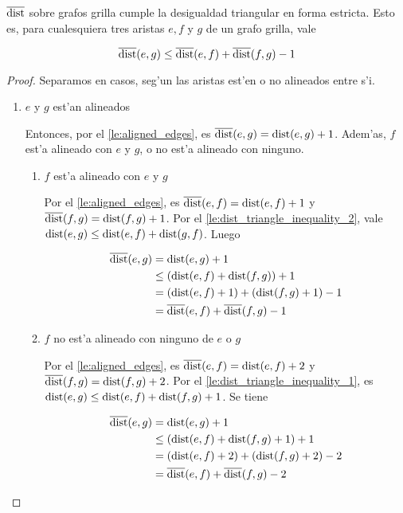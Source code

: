 \begin{theorem}
\label{th:distmax_clients_is_metric_strictly}
$\overline{\textnormal{dist}}$ sobre grafos grilla cumple la desigualdad triangular en forma estricta. Esto es, para cualesquiera tres aristas $e, f$ y $g$ de un grafo grilla, vale

\[\overline{\textnormal{dist}}(e, g) \leq \overline{\textnormal{dist}}(e, f) + \overline{\textnormal{dist}}(f, g) - 1\]

\begin{proof}
Separamos en casos, seg'un las aristas est'en o no alineados entre s'i.

\begin{enumerate}
\item $e$ y $g$ est'an alineados

Entonces, por el \autoref{le:aligned_edges}, es $\overline{\textnormal{dist}}(e, g) = \textnormal{dist}(e, g) + 1$. Adem'as, $f$ est'a alineado con $e$ y $g$, o no est'a alineado con ninguno.

\begin{enumerate}
\item $f$ est'a alineado con $e$ y $g$

Por el \autoref{le:aligned_edges}, es $\overline{\textnormal{dist}}(e, f) = \textnormal{dist}(e, f) + 1$ y $\overline{\textnormal{dist}}(f, g) = \textnormal{dist}(f, g) + 1$. Por el \autoref{le:dist_triangle_inequality_2}, vale $\textnormal{dist}(e, g) \leq \textnormal{dist}(e, f) + \textnormal{dist}(g, f)$. Luego

\begin{align*}
\overline{\textnormal{dist}}(e, g) &= \textnormal{dist}(e, g) + 1\\
&\leq (\textnormal{dist}(e, f) + \textnormal{dist}(f, g)) + 1\\
&= (\textnormal{dist}(e, f) + 1) + (\textnormal{dist}(f, g) + 1) - 1\\
&= \overline{\textnormal{dist}}(e, f) + \overline{\textnormal{dist}}(f, g) - 1
\end{align*}

\item $f$ no est'a alineado con ninguno de $e$ o $g$

Por el \autoref{le:aligned_edges}, es $\overline{\textnormal{dist}}(e, f) = \textnormal{dist}(e, f) + 2$ y $\overline{\textnormal{dist}}(f, g) = \textnormal{dist}(f, g) + 2$. Por el \autoref{le:dist_triangle_inequality_1}, es $\textnormal{dist}(e, g) \leq \textnormal{dist}(e, f) + \textnormal{dist}(f, g) + 1$. Se tiene

\begin{align*}
\overline{\textnormal{dist}}(e, g) &= \textnormal{dist}(e, g) + 1\\
&\leq (\textnormal{dist}(e, f) + \textnormal{dist}(f, g) + 1) + 1\\
&= (\textnormal{dist}(e, f) + 2) + (\textnormal{dist}(f, g) + 2) - 2\\
&= \overline{\textnormal{dist}}(e, f) + \overline{\textnormal{dist}}(f, g) - 2
\end{align*}
\end{enumerate}


\end{enumerate}
\end{proof}
\end{theorem}
